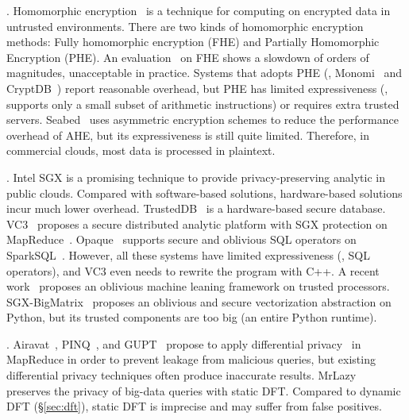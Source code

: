 . Homomorphic 
encryption~\cite{fullmomo:stoc09} is a
technique for computing on encrypted data in untrusted 
environments. There are two kinds of homomorphic encryption methods: 
Fully homomorphic encryption (FHE) and Partially 
Homomorphic Encryption (PHE). An evaluation~\cite{homo:eval} on FHE shows a 
slowdown of orders of magnitudes, unacceptable in practice. Systems that adopts 
PHE (\eg, Monomi~\cite{monomi:vldb13} and CryptDB~\cite{cryptdb:sosp11})
report reasonable overhead, but PHE has limited 
expressiveness (\eg, supports only a small subset of arithmetic instructions) 
or requires extra trusted servers. Seabed~\cite{seabed:osdi16} uses asymmetric 
encryption schemes to reduce the performance overhead of AHE, but its 
expressiveness is still quite limited. Therefore, in commercial clouds, most 
data is processed in plaintext.

. Intel SGX is a promising technique 
to provide privacy-preserving analytic in public clouds. Compared with 
software-based solutions, hardware-based solutions incur much lower overhead. 
TrustedDB~\cite{trusteddb:sigmod11} is a hardware-based secure database.
VC3~\cite{vc3:sp15} proposes a secure distributed analytic platform
with SGX protection on MapReduce~\cite{mapreduce}. 
Opaque~\cite{opaque:nsdi17} supports secure and oblivious SQL operators on 
SparkSQL~\cite{sparksql:sigmod15}. However, all these systems have limited 
expressiveness (\eg, SQL operators), and VC3 even needs to rewrite the program 
with C++. A recent work~\cite{oblivious:security16} proposes an oblivious 
machine leaning framework on trusted processors. 
SGX-BigMatrix~\cite{bigmatrix:ccs17} proposes an oblivious and secure 
vectorization abstraction on Python, but its trusted components are too big (an 
entire Python runtime).


.  
Airavat~\cite{airavat:nsdi10}, PINQ~\cite{pinq:sigmod09}, and 
GUPT~\cite{gupt:sigmod12} propose to apply differential 
privacy~\cite{noise:tcc06} in MapReduce in order to prevent leakage from 
malicious queries, but existing differential privacy techniques often produce
inaccurate results. MrLazy~\cite{hotcloud14:mrlazy} preserves the privacy of 
big-data queries with static DFT. Compared to dynamic DFT (\S\ref{sec:dft}), 
static DFT is imprecise and may suffer from false positives.


